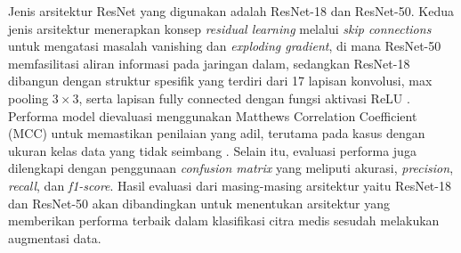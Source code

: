 Jenis arsitektur ResNet yang digunakan adalah ResNet-18 dan ResNet-50. 
Kedua jenis arsitektur menerapkan 
konsep \textit{residual learning} melalui \textit{skip connections} untuk 
mengatasi masalah vanishing dan \textit{exploding gradient}, di mana 
ResNet-50 memfasilitasi aliran informasi pada jaringan dalam, sedangkan 
ResNet-18 dibangun dengan struktur spesifik yang terdiri dari 17 lapisan 
konvolusi, max pooling $3\times3$, serta lapisan fully connected dengan 
fungsi aktivasi ReLU \cite{jiemesha2025classification} \cite{francis2025deep}. 
Performa model dievaluasi menggunakan Matthews Correlation Coefficient (MCC) 
untuk memastikan penilaian yang adil, terutama pada kasus dengan ukuran 
kelas data yang tidak seimbang \cite{aggarwal2019data}. Selain itu, 
evaluasi performa juga dilengkapi dengan penggunaan \textit{confusion matrix} 
yang meliputi akurasi, \textit{precision}, \textit{recall}, dan \textit{f1-score}. 
Hasil evaluasi dari masing-masing arsitektur yaitu ResNet-18 dan ResNet-50 
akan dibandingkan untuk menentukan arsitektur yang memberikan performa 
terbaik dalam klasifikasi citra medis sesudah melakukan augmentasi data. \par



